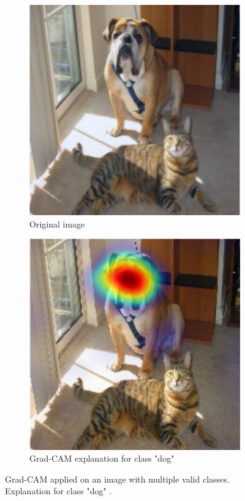 \begin{figure}[H]
    \centering
    \begin{subfigure}{.5\textwidth}
        \centering
        \includegraphics[width=0.7\linewidth]{chapters/02_methods/images/grad-cam-original.png}
        \caption{Original image}
    \end{subfigure}\hfill%
    \begin{subfigure}{.5\textwidth}
        \centering
        \includegraphics[width=0.7\linewidth]{chapters/02_methods/images/grad-cam-dog.png}
        \caption{Grad-CAM explanation for class "dog"}
    \end{subfigure}
    \caption{Grad-CAM applied on an image with multiple valid classes. Explanation for class "dog" \cite{selvaraju2017grad}.}
    \label{grad_cam_dog}
\end{figure}

